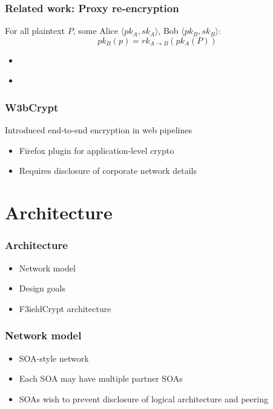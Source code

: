 \documentclass{beamer}
\begin{document}
\begin{frame}
\frametitle{Related work: Proxy re-encryption}
For all plaintext $P$, some Alice $\langle pk_A, sk_A \rangle$, Bob $\langle
pk_B, sk_B \rangle$:
\begin{equation*}
pk_B(p) = rk_{A \to B}( pk_A (P))
\end{equation*}
\begin{itemize}
\item \cite{atomic_proxy_reencryption} 
\item \cite{proxy_reencryption}
\end{itemize}
\end{frame}

\begin{frame}
\frametitle{W3bCrypt}
Introduced end-to-end encryption in web pipelines
\smallskip
\begin{itemize}
\item Firefox plugin for application-level crypto
\item Requires disclosure of corporate network details
\end{itemize}
\end{frame}

\section{Architecture}
\begin{frame}
\frametitle{Architecture}
\begin{itemize}
\item Network model
\item Design goals
\item F3ieldCrypt architecture
\end{itemize}
\end{frame}

\begin{frame}
\frametitle{Network model}
\begin{itemize}
\item SOA-style network
\item Each SOA may have multiple partner SOAs
\item SOAs wish to prevent disclosure of logical architecture and peering 
\end{itemize}
\end{frame}

\end{document}
